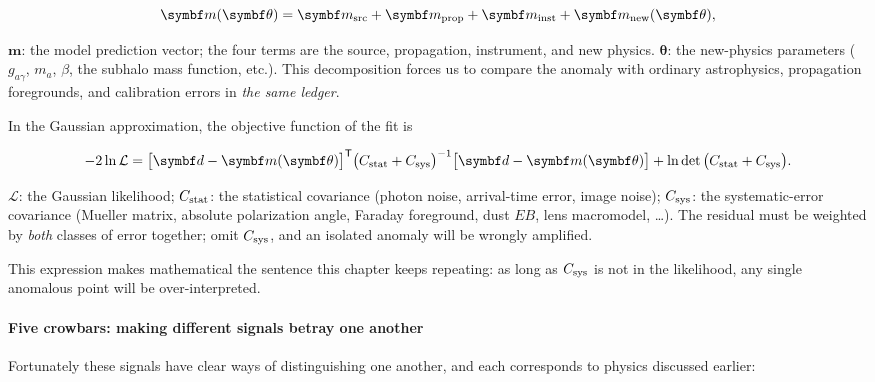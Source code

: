\begin{equation}
  \bm m(\bm\theta)=\bm m_{\rm src}+\bm m_{\rm prop}+\bm m_{\rm inst}+\bm m_{\rm new}(\bm\theta),
  \label{eq:e22-model-vector}
\end{equation}
\begin{formulaexplain}
\(\bm m\): the model prediction vector; the four terms are the source, propagation, instrument, and new physics. \(\bm\theta\): the new-physics parameters (\(g_{a\gamma}\), \(m_a\), \(\beta\), the subhalo mass function, etc.). This decomposition forces us to compare the anomaly with ordinary astrophysics, propagation foregrounds, and calibration errors in \emph{the same ledger}.
\end{formulaexplain}

In the Gaussian approximation, the objective function of the fit is

\begin{equation}
  -2\ln\mathcal L=\big[\bm d-\bm m(\bm\theta)\big]^{\mathsf T}
  \big(C_{\rm stat}+C_{\rm sys}\big)^{-1}
  \big[\bm d-\bm m(\bm\theta)\big]
  +\ln\det\big(C_{\rm stat}+C_{\rm sys}\big).
  \label{eq:e22-likelihood-gauss}
\end{equation}
\begin{formulaexplain}
\(\mathcal L\): the Gaussian likelihood; \(C_{\rm stat}\): the statistical covariance (photon noise, arrival-time error, image noise); \(C_{\rm sys}\): the systematic-error covariance (Mueller matrix, absolute polarization angle, Faraday foreground, dust \(EB\), lens macromodel, \ldots). The residual must be weighted by \emph{both} classes of error together; omit \(C_{\rm sys}\), and an isolated anomaly will be wrongly amplified.
\end{formulaexplain}

This expression makes mathematical the sentence this chapter keeps repeating: as long as \(C_{\rm sys}\) is not in the likelihood, any single anomalous point will be over-interpreted.

\paragraph{Five crowbars: making different signals betray one another}

Fortunately these signals have clear ways of distinguishing one another, and each corresponds to physics discussed earlier:


